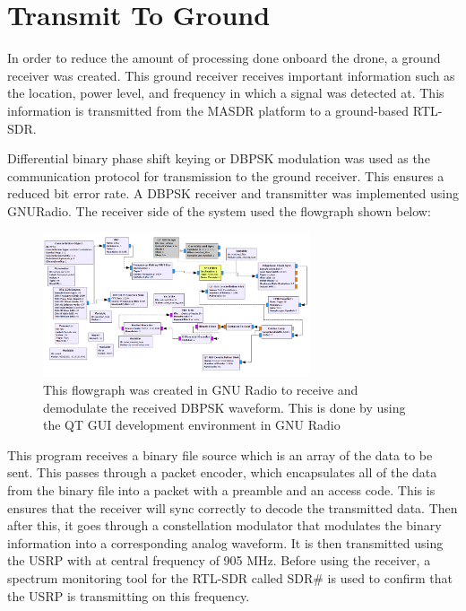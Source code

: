 
\section{Transmit To Ground}

In order to reduce the amount of processing done onboard the drone, a ground receiver was created.  This ground receiver receives important information such as the location, power level, and frequency in which a signal was detected at.  This information is transmitted from the MASDR platform to a ground-based RTL-SDR.  

Differential binary phase shift keying or DBPSK modulation was used as the communication protocol for transmission to the ground receiver. This ensures a reduced bit error rate. A DBPSK receiver and transmitter was implemented using GNURadio. The receiver side of the system used the flowgraph shown below:

\begin{figure}[h]
  \centering
  \includegraphics[width=0.70\textwidth]{img/rxflow.PNG}
  \caption{This flowgraph was created in GNU Radio to receive and demodulate the received DBPSK waveform. This is done by using the QT GUI development environment in GNU Radio}
  \label{fig:rxflow}
\end{figure}

This program receives a binary file source which is an array of the data to be sent. This passes through a packet encoder, which encapsulates all of the data from the binary file into a packet with a preamble and an access code.  This is ensures that the receiver will sync correctly to decode the transmitted data.  Then after this, it goes through a constellation modulator that modulates the binary information into a corresponding analog waveform. It is then transmitted using the USRP with at central frequency of 905 MHz.  Before using the receiver, a spectrum monitoring tool for the RTL-SDR called SDR\# is used to confirm that the USRP is transmitting on this frequency.

